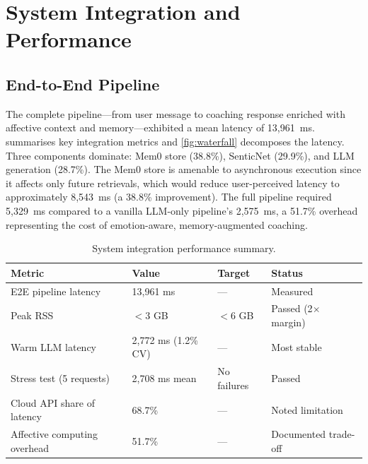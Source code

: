 \section{System Integration and Performance}
\label{sec:integration-evaluation}

\subsection{End-to-End Pipeline}
\label{subsec:e2e-pipeline}

The complete pipeline---from user message to coaching response enriched with affective context and memory---exhibited a mean latency of 13,961~ms.  summarises key integration metrics and \cref{fig:waterfall} decomposes the latency. Three components dominate: Mem0 store (38.8\%), SenticNet (29.9\%), and LLM generation (28.7\%). The Mem0 store is amenable to asynchronous execution since it affects only future retrievals, which would reduce user-perceived latency to approximately 8,543~ms (a 38.8\% improvement). The full pipeline required 5,329~ms compared to a vanilla LLM-only pipeline's 2,575~ms, a 51.7\% overhead representing the cost of emotion-aware, memory-augmented coaching.

\begin{table}[htbp]
  \centering
  \caption{System integration performance summary.}
  \label{tab:integration-summary}
  \begin{tabular}{@{}llll@{}}
    \toprule
    \textbf{Metric} & \textbf{Value} & \textbf{Target} & \textbf{Status} \\
    \midrule
    E2E pipeline latency         & 13,961 ms            & ---         & Measured \\
    Peak RSS                     & $<$3 GB              & $<$6 GB     & Passed (2$\times$ margin) \\
    Warm LLM latency             & 2,772 ms (1.2\% CV)  & ---         & Most stable \\
    Stress test (5 requests)     & 2,708 ms mean        & No failures & Passed \\
    Cloud API share of latency   & 68.7\%               & ---         & Noted limitation \\
    Affective computing overhead & 51.7\%               & ---         & Documented trade-off \\
    \bottomrule
  \end{tabular}
\end{table}

